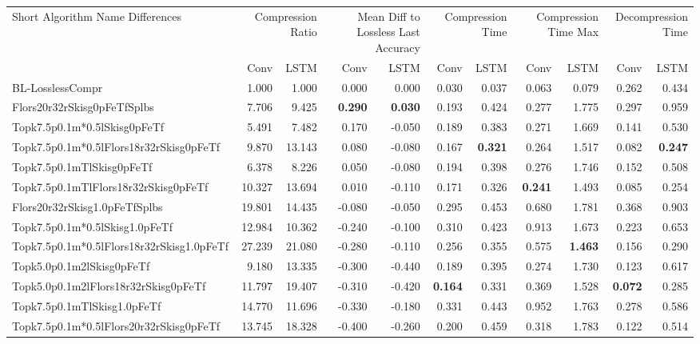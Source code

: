 \begin{tabular}{lrrrrrrrrrr}
\toprule
\multicolumn{1}{p{2.5cm}}{Short Algorithm Name Differences} & \multicolumn{2}{p{1.7cm}}{Compression Ratio} & \multicolumn{2}{p{1.7cm}}{Mean Diff to Lossless Last Accuracy} & \multicolumn{2}{p{1.7cm}}{Compression Time} & \multicolumn{2}{p{1.7cm}}{Compression Time Max} & \multicolumn{2}{p{1.7cm}}{Decompression Time} \\
 & Conv & LSTM & Conv & LSTM & Conv & LSTM & Conv & LSTM & Conv & LSTM \\
\midrule
BL-LosslessCompr & 1.000 & 1.000 & 0.000 & 0.000 & 0.030 & 0.037 & 0.063 & 0.079 & 0.262 & 0.434 \\
Flors20r32rSkisg0pFeTfSplbs & 7.706 & 9.425 & \bfseries 0.290 & \bfseries 0.030 & 0.193 & 0.424 & 0.277 & 1.775 & 0.297 & 0.959 \\
Topk7.5p0.1m*0.5lSkisg0pFeTf & 5.491 & 7.482 & 0.170 & -0.050 & 0.189 & 0.383 & 0.271 & 1.669 & 0.141 & 0.530 \\
Topk7.5p0.1m*0.5lFlors18r32rSkisg0pFeTf & 9.870 & 13.143 & 0.080 & -0.080 & 0.167 & \bfseries 0.321 & 0.264 & 1.517 & 0.082 & \bfseries 0.247 \\
Topk7.5p0.1mTlSkisg0pFeTf & 6.378 & 8.226 & 0.050 & -0.080 & 0.194 & 0.398 & 0.276 & 1.746 & 0.152 & 0.508 \\
Topk7.5p0.1mTlFlors18r32rSkisg0pFeTf & 10.327 & 13.694 & 0.010 & -0.110 & 0.171 & 0.326 & \bfseries 0.241 & 1.493 & 0.085 & 0.254 \\
Flors20r32rSkisg1.0pFeTfSplbs & 19.801 & 14.435 & -0.080 & -0.050 & 0.295 & 0.453 & 0.680 & 1.781 & 0.368 & 0.903 \\
Topk7.5p0.1m*0.5lSkisg1.0pFeTf & 12.984 & 10.362 & -0.240 & -0.100 & 0.310 & 0.423 & 0.913 & 1.673 & 0.223 & 0.653 \\
Topk7.5p0.1m*0.5lFlors18r32rSkisg1.0pFeTf & 27.239 & 21.080 & -0.280 & -0.110 & 0.256 & 0.355 & 0.575 & \bfseries 1.463 & 0.156 & 0.290 \\
Topk5.0p0.1m2lSkisg0pFeTf & 9.180 & 13.335 & -0.300 & -0.440 & 0.189 & 0.395 & 0.274 & 1.730 & 0.123 & 0.617 \\
Topk5.0p0.1m2lFlors18r32rSkisg0pFeTf & 11.797 & 19.407 & -0.310 & -0.420 & \bfseries 0.164 & 0.331 & 0.369 & 1.528 & \bfseries 0.072 & 0.285 \\
Topk7.5p0.1mTlSkisg1.0pFeTf & 14.770 & 11.696 & -0.330 & -0.180 & 0.331 & 0.443 & 0.952 & 1.763 & 0.278 & 0.586 \\
Topk7.5p0.1m*0.5lFlors20r32rSkisg0pFeTf & 13.745 & 18.328 & -0.400 & -0.260 & 0.200 & 0.459 & 0.318 & 1.783 & 0.122 & 0.514 \\

\end{tabular}

